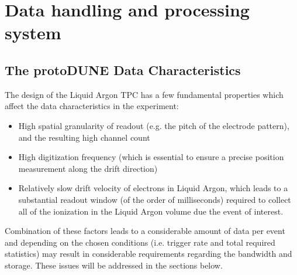 \section{Data handling and processing system}

\subsection{The protoDUNE Data Characteristics}

The design of the Liquid Argon TPC has a few fundamental properties which affect the data characteristics in the experiment:
\begin{itemize}
\item High spatial granularity of readout (e.g. the pitch of the electrode pattern), and the resulting high channel count
\item High digitization frequency (which is essential to ensure a precise position measurement along the drift direction)
\item Relatively slow drift velocity of electrons in Liquid Argon, which  leads to a substantial readout window (of the order of milliseconds) required to collect
all of the ionization in the Liquid Argon volume due the event of interest. 
\end{itemize}

\noindent
Combination of these factors leads to a considerable amount of data per event and depending on
the chosen conditions (i.e. trigger rate and total required statistics) may result in considerable requirements
regarding the bandwidth and storage. These issues will be addressed in the sections below.



